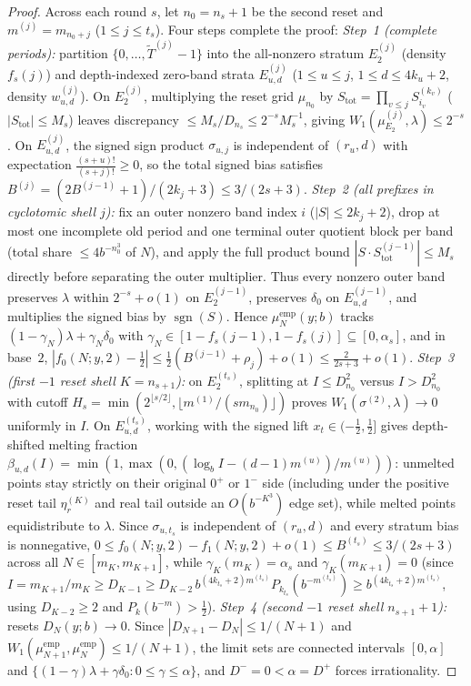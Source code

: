 \documentclass[11pt]{article}
\DeclareMathOperator{\sgn}{sgn}
\begin{document}
\begin{proof}
Across each round $s$, let $n_0=n_s+1$ be the second reset and $m^{(j)}=m_{n_0+j}$ ($1\le j\le t_s$). Four steps complete the proof:
\emph{Step~1 (complete periods):} partition $\{0,\dots,\widetilde T^{(j)}-1\}$ into the all-nonzero stratum $E_2^{(j)}$ (density $f_s(j)$) and depth-indexed zero-band strata $E_{u,d}^{(j)}$ ($1\le u\le j$, $1\le d\le 4k_u+2$, density $w_{u,d}^{(j)}$). On $E_2^{(j)}$, multiplying the reset grid $\mu_{n_0}$ by $S_{\mathrm{tot}}=\prod_{v\le j}S_{i_v}^{(k_v)}$ ($|S_{\mathrm{tot}}|\le M_s$) leaves discrepancy $\le M_s/D_{n_s}\le 2^{-s}M_s^{-1}$, giving $W_1(\mu_{E_2}^{(j)},\lambda)\le 2^{-s}$. On $E_{u,d}^{(j)}$, the signed sign product $\sigma_{u,j}$ is independent of $(r_u,d)$ with expectation $\frac{(s+u)!}{(s+j)!}\ge0$, so the total signed bias satisfies $B^{(j)}=(2B^{(j-1)}+1)/(2k_j+3)\le 3/(2s+3)$.
\emph{Step~2 (all prefixes in cyclotomic shell $j$):} fix an outer nonzero band index $i$ ($|S|\le 2k_j+2$), drop at most one incomplete old period and one terminal outer quotient block per band (total share $\le 4b^{-n_0^3}$ of $N$), and apply the full product bound $|S\cdot S_{\mathrm{tot}}^{(j-1)}|\le M_s$ directly before separating the outer multiplier. Thus every nonzero outer band preserves $\lambda$ within $2^{-s}+o(1)$ on $E_2^{(j-1)}$, preserves $\delta_0$ on $E_{u,d}^{(j-1)}$, and multiplies the signed bias by $\sgn(S)$. Hence $\mu_N^{\mathrm{emp}}(y;b)$ tracks $(1-\gamma_N)\lambda+\gamma_N\delta_0$ with $\gamma_N\in[1-f_s(j-1),1-f_s(j)]\subseteq[0,\alpha_s]$, and in base~$2$, $|f_0(N;y,2)-\frac12|\le\frac12(B^{(j-1)}+\rho_j)+o(1)\le\frac2{2s+3}+o(1)$.
\emph{Step~3 (first $-1$ reset shell $K=n_{s+1}$):} on $E_2^{(t_s)}$, splitting at $I\le D_{n_0}^2$ versus $I>D_{n_0}^2$ with cutoff $H_s=\min(2^{\lfloor s/2\rfloor},\lfloor m^{(1)}/(sm_{n_0})\rfloor)$ proves $W_1(\sigma^{(2)},\lambda)\to0$ uniformly in $I$. On $E_{u,d}^{(t_s)}$, working with the signed lift $x_t\in(-\frac12,\frac12]$ gives depth-shifted melting fraction $\beta_{u,d}(I)=\min(1,\max(0,(\log_b I-(d-1)m^{(u)})/m^{(u)}))$: unmelted points stay strictly on their original $0^+$ or $1^-$ side (including under the positive reset tail $\eta_r^{(K)}$ and real tail outside an $O(b^{-K^3})$ edge set), while melted points equidistribute to $\lambda$. Since $\sigma_{u,t_s}$ is independent of $(r_u,d)$ and every stratum bias is nonnegative, $0\le f_0(N;y,2)-f_1(N;y,2)+o(1)\le B^{(t_s)}\le 3/(2s+3)$ across all $N\in[m_K,m_{K+1}]$, while $\gamma_K(m_K)=\alpha_s$ and $\gamma_K(m_{K+1})=0$ (since $I=m_{K+1}/m_K\ge D_{K-1}\ge D_{K-2}\,b^{(4k_{t_s}+2)m^{(t_s)}}P_{k_{t_s}}(b^{-m^{(t_s)}})\ge b^{(4k_{t_s}+2)m^{(t_s)}}$, using $D_{K-2}\ge2$ and $P_k(b^{-m})>\frac12$).
\emph{Step~4 (second $-1$ reset shell $n_{s+1}+1$):}  resets $D_N(y;b)\to0$. Since $|D_{N+1}-D_N|\le 1/(N+1)$ and $W_1(\mu_{N+1}^{\mathrm{emp}},\mu_N^{\mathrm{emp}})\le 1/(N+1)$, the limit sets are connected intervals $[0,\alpha]$ and $\{(1-\gamma)\lambda+\gamma\delta_0:0\le\gamma\le\alpha\}$, and $D^-=0<\alpha=D^+$ forces irrationality.
\end{proof}
\end{document}
